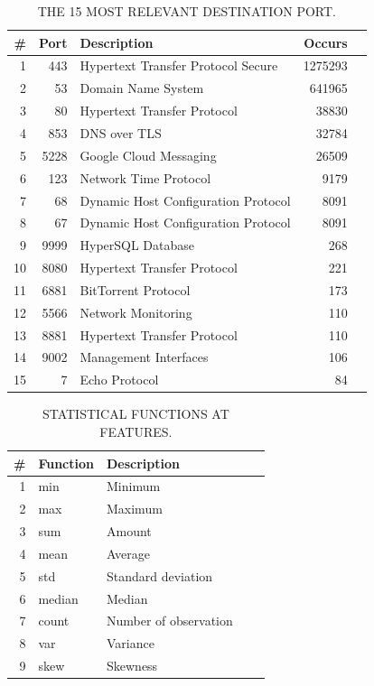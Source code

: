\begin{table}[ht]
  \caption{THE 15 MOST RELEVANT DESTINATION PORT.}
  \centering
  \begin{small}
    \begin{tabular}{rrlrr}   \hline
 \# & Port & Description & Occurs  \\ \hline

1 &  443 &  Hypertext Transfer Protocol Secure &  1275293  \\ 
  2 &  53 & Domain Name System & 641965  \\ 
  3 &  80 & Hypertext Transfer Protocol &  38830  \\ 
  4 &  853 & DNS over TLS &  32784  \\ 
  5 &  5228 & Google Cloud Messaging &  26509  \\ 
  6 &  123 & Network Time Protocol & 9179  \\ 
  7 &  68 & Dynamic Host Configuration Protocol &  8091  \\ 
  8 &  67 & Dynamic Host Configuration Protocol &  8091  \\ 
  9 &  9999 & HyperSQL Database &  268  \\ 
  10 & 8080 & Hypertext Transfer Protocol & 221  \\ 
  11 & 6881 & BitTorrent Protocol & 173  \\ 
  12 & 5566 & Network Monitoring & 110  \\ 
  13 & 8881 & Hypertext Transfer Protocol & 110  \\ 
  14 & 9002 & Management Interfaces & 106  \\ 
  15 & 7 & Echo Protocol & 84  \\ 
   \hline

 \end{tabular}
 \end{small}
 \label{tab:port}
 \end{table}


\begin{table}[ht]
  \caption{STATISTICAL FUNCTIONS AT FEATURES.}
  \centering
  \begin{small}
    \begin{tabular}{rllrr}   \hline
 \# & Function & Description\\ \hline

1 &  min &  Minimum\\ 
  2 &  max & Maximum\\ 
  3 &  sum & Amount\\ 
  4 &  mean & Average\\ 
  5 &  std & Standard deviation \\ 
  6 &  median & Median\\ 
  7 &  count & Number of observation\\ 
  8 &  var & Variance\\ 
  9 &  skew & Skewness \\ 
   \hline

 \end{tabular}
 \end{small}
 \label{tab:function}
 \end{table}



